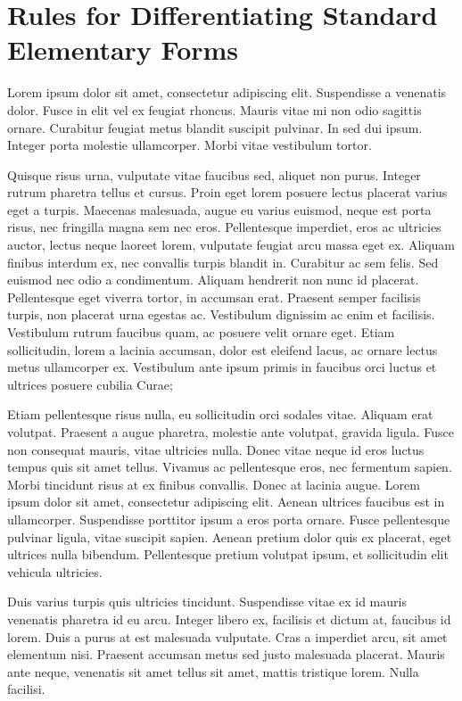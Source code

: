 \chapter{Rules for Differentiating Standard Elementary Forms}
\label{ch:05}

Lorem ipsum dolor sit amet, consectetur adipiscing elit. Suspendisse a venenatis dolor. Fusce in elit vel ex feugiat rhoncus. Mauris vitae mi non odio sagittis ornare. Curabitur feugiat metus blandit suscipit pulvinar. In sed dui ipsum. Integer porta molestie ullamcorper. Morbi vitae vestibulum tortor.

Quisque risus urna, vulputate vitae faucibus sed, aliquet non purus. Integer rutrum pharetra tellus et cursus. Proin eget lorem posuere lectus placerat varius eget a turpis. Maecenas malesuada, augue eu varius euismod, neque est porta risus, nec fringilla magna sem nec eros. Pellentesque imperdiet, eros ac ultricies auctor, lectus neque laoreet lorem, vulputate feugiat arcu massa eget ex. Aliquam finibus interdum ex, nec convallis turpis blandit in. Curabitur ac sem felis. Sed euismod nec odio a condimentum. Aliquam hendrerit non nunc id placerat. Pellentesque eget viverra tortor, in accumsan erat. Praesent semper facilisis turpis, non placerat urna egestas ac. Vestibulum dignissim ac enim et facilisis. Vestibulum rutrum faucibus quam, ac posuere velit ornare eget. Etiam sollicitudin, lorem a lacinia accumsan, dolor est eleifend lacus, ac ornare lectus metus ullamcorper ex. Vestibulum ante ipsum primis in faucibus orci luctus et ultrices posuere cubilia Curae;

Etiam pellentesque risus nulla, eu sollicitudin orci sodales vitae. Aliquam erat volutpat. Praesent a augue pharetra, molestie ante volutpat, gravida ligula. Fusce non consequat mauris, vitae ultricies nulla. Donec vitae neque id eros luctus tempus quis sit amet tellus. Vivamus ac pellentesque eros, nec fermentum sapien. Morbi tincidunt risus at ex finibus convallis. Donec at lacinia augue. Lorem ipsum dolor sit amet, consectetur adipiscing elit. Aenean ultrices faucibus est in ullamcorper. Suspendisse porttitor ipsum a eros porta ornare. Fusce pellentesque pulvinar ligula, vitae suscipit sapien. Aenean pretium dolor quis ex placerat, eget ultrices nulla bibendum. Pellentesque pretium volutpat ipsum, et sollicitudin elit vehicula ultricies.

Duis varius turpis quis ultricies tincidunt. Suspendisse vitae ex id mauris venenatis pharetra id eu arcu. Integer libero ex, facilisis et dictum at, faucibus id lorem. Duis a purus at est malesuada vulputate. Cras a imperdiet arcu, sit amet elementum nisi. Praesent accumsan metus sed justo malesuada placerat. Mauris ante neque, venenatis sit amet tellus sit amet, mattis tristique lorem. Nulla facilisi.

